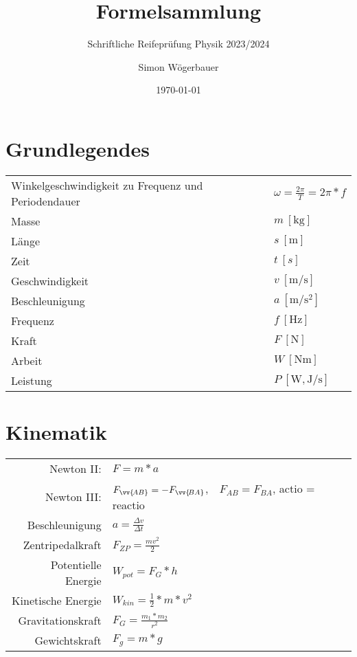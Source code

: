 \documentclass{paper}
\makeatletter
\newcommand{\mathleft}{\@fleqntrue\@mathmargin0pt}
\makeatother
\begin{document}
\title{Formelsammlung}
\subtitle{Schriftliche Reifeprüfung Physik 2023/2024}
\author{Simon Wögerbauer}
\date{\today}
\maketitle
\smalltableofcontents
\mathleft
\section{Grundlegendes}
\begin{tabularx}{\textwidth}{X|X}
	Winkelgeschwindigkeit zu Frequenz und Periodendauer & $\omega = \frac{2\pi}{T}=2\pi*f$ \\
	Masse & $m\: [\unit{\kilo\gram}]$ \\
	Länge & $s\: [\unit{\meter}]$\\
Zeit & $t\:[s]$\\
Geschwindigkeit & $v\:[\unit{\meter\per\second}]$\\
Beschleunigung & $a\:[\unit{\meter\per\second\squared}]$\\
Frequenz & $f\: [\unit{\hertz}]$\\
Kraft & $F\: [\unit{\newton}]$\\
Arbeit & $W \: [\unit{\newton\meter}]$\\
Leistung & $P \: [\unit{\watt},\unit{\joule\per\second}]$
\end{tabularx}

\section{Kinematik}
\mathleft
\begin{tabularx}{\textwidth}{r|X}
	Newton II: & $F=m*a$\\
	Newton III: & ${F}_{\vv{\!AB}}=-{F}_{\vv{\!BA}}$,$\quad F_{AB} = F_{BA}$, actio = reactio \\
	Beschleunigung & $a=\frac{\Delta v}{\Delta t}$\\
	Zentripedalkraft & $F_{ZP}=\frac{mv^2}{2}$\\
	Potentielle Energie & $W_{pot} = F_G * h$\\
	Kinetische Energie & $W_{kin} = \frac{1}{2}*m*v^2$ \\
	Gravitationskraft & $F_G = \frac{m_1 * m_2 }{r^2}$\\
	Gewichtskraft & $F_g = m * g$\\
\end{tabularx}
\end{document}

